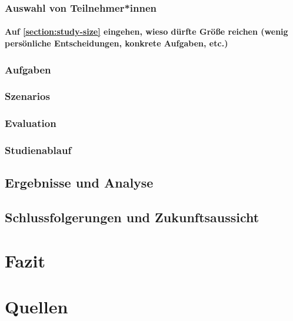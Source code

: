 \documentclass[a4paper, 12pt, oneside, BCOR=1cm,toc=chapterentrywithdots]{scrbook}
\begin{document}
\subsection{Auswahl von Teilnehmer*innen}
\subsubsection{Auf \ref{section:study-size} eingehen, wieso dürfte Größe reichen (wenig persönliche Entscheidungen, konkrete Aufgaben, etc.)}
\subsection{Aufgaben}
\subsection{Szenarios}
\subsection{Evaluation}
\subsection{Studienablauf}
\section{Ergebnisse und Analyse}
\section{Schlussfolgerungen und Zukunftsaussicht}

\chapter{Fazit}


\nocite{*}
\chapter*{Quellen}
\begingroup
\let\clearpage\relax
\printbibliography[filter=articles, title=Artikel, heading=subbibliography]
\printbibliography[filter=books, title=Bücher, heading=subbibliography]
\printbibliography[filter=other, title=sonstige, heading=subbibliography]
\endgroup

\printindex
\end{document}
